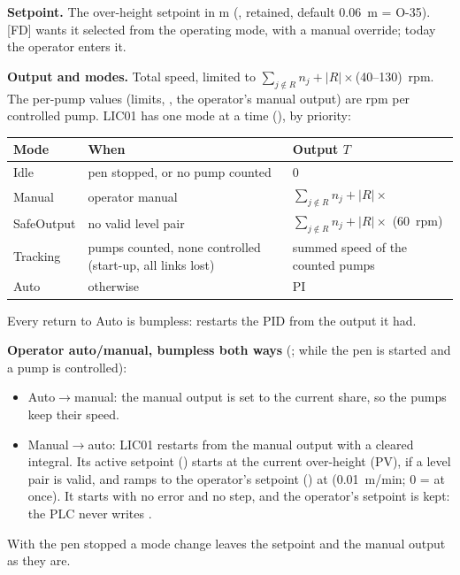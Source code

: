 \documentclass[11pt,a4paper]{article}
\begin{document}
\textbf{Setpoint.} The over-height setpoint in m (, retained, default
0.06~m = O-35). [FD] wants it selected from the operating mode, with a manual override; today the
operator enters it.

\textbf{Output and modes.} Total speed, limited to $\sum_{j\notin R} n_j + |R|\times$(40--130)~rpm. The
per-pump values (limits, , the operator's manual output) are rpm per controlled pump. LIC01
has one mode at a time (), by priority:
\begin{center}
\begin{tabularx}{\textwidth}{@{}lLL@{}}
\toprule
Mode & When & Output $T$ \\
\midrule
Idle & pen stopped, or no pump counted & 0 \\
Manual & operator manual & $\sum_{j\notin R} n_j + |R|\times$ \\
SafeOutput & no valid level pair & $\sum_{j\notin R} n_j + |R|\times$ (60~rpm) \\
Tracking & pumps counted, none controlled (start-up, all links lost) & summed speed of the counted pumps \\
Auto & otherwise & PI \\
\bottomrule
\end{tabularx}
\end{center}
Every return to Auto is bumpless:  restarts the PID from the output it had.

\textbf{Operator auto/manual, bumpless both ways} (; while the pen is started and a
pump is controlled):
\begin{itemize}
  \item Auto$\to$manual: the manual output is set to the current share, so the pumps keep their speed.
  \item Manual$\to$auto: LIC01 restarts from the manual output with a cleared integral. Its active setpoint
        () starts at the current over-height (PV), if a level pair is
        valid, and ramps to the operator's setpoint () at 
        (0.01~m/min; 0 = at once). It starts with no error and no step, and the operator's setpoint is kept:
        the PLC never writes .
\end{itemize}
With the pen stopped a mode change leaves the setpoint and the manual output as they are.
\end{document}
